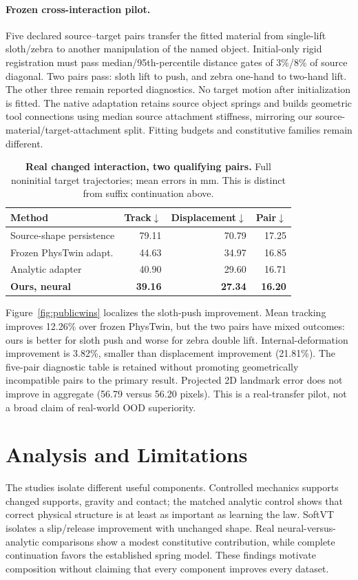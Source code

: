 \documentclass[10pt,twocolumn,letterpaper]{article}
\begin{document}
\paragraph{Frozen cross-interaction pilot.}
Five declared source--target pairs transfer the fitted material from single-lift sloth/zebra to another manipulation of the named object. Initial-only rigid registration must pass median/95th-percentile distance gates of 3\%/8\% of source diagonal. Two pairs pass: sloth lift to push, and zebra one-hand to two-hand lift. The other three remain reported diagnostics. No target motion after initialization is fitted. The native adaptation retains source object springs and builds geometric tool connections using median source attachment stiffness, mirroring our source-material/target-attachment split. Fitting budgets and constitutive families remain different.
\begin{table}[t]
\centering\small\setlength{\tabcolsep}{3pt}
\caption{\textbf{Real changed interaction, two qualifying pairs.} Full noninitial target trajectories; mean errors in mm. This is distinct from suffix continuation above.}
\label{tab:realtransfer}
\begin{tabular}{lrrr}\toprule
Method & Track$\downarrow$ & Displacement$\downarrow$ & Pair$\downarrow$\\\midrule
Source-shape persistence &79.11&70.79&17.25\\
Frozen PhysTwin adapt. &44.63&34.97&16.85\\
Analytic adapter &40.90&29.60&16.71\\
\textbf{Ours, neural} &\textbf{39.16}&\textbf{27.34}&\textbf{16.20}\\\bottomrule
\end{tabular}
\end{table}
Figure~\ref{fig:publicwins} localizes the sloth-push improvement. Mean tracking improves 12.26\% over frozen PhysTwin, but the two pairs have mixed outcomes: ours is better for sloth push and worse for zebra double lift. Internal-deformation improvement is 3.82\%, smaller than displacement improvement (21.81\%). The five-pair diagnostic table is retained without promoting geometrically incompatible pairs to the primary result. Projected 2D landmark error does not improve in aggregate (56.79 versus 56.20 pixels). This is a real-transfer pilot, not a broad claim of real-world OOD superiority.




\section{Analysis and Limitations}
The studies isolate different useful components. Controlled mechanics supports changed supports, gravity and contact; the matched analytic control shows that correct physical structure is at least as important as learning the law. SoftVT isolates a slip/release improvement with unchanged shape. Real neural-versus-analytic comparisons show a modest constitutive contribution, while complete continuation favors the established spring model. These findings motivate composition without claiming that every component improves every dataset.
\end{document}
